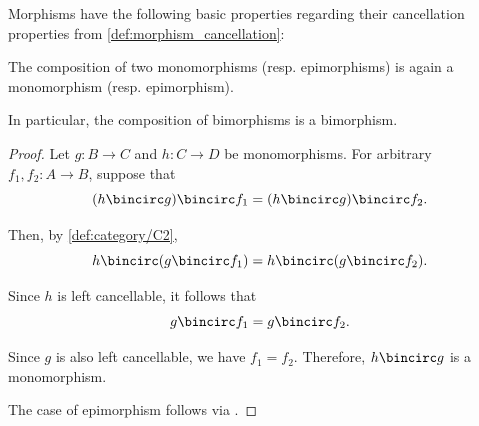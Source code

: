 \begin{proposition}\label{thm:def:morphism_cancellation}
  Morphisms have the following basic properties regarding their cancellation properties from \cref{def:morphism_cancellation}:
  \begin{thmenum}
     The composition of two monomorphisms (resp. epimorphisms) is again a monomorphism (resp. epimorphism).

    In particular, the composition of bimorphisms is a bimorphism.
  \end{thmenum}
\end{proposition}
\begin{proof}
   Let \( g: B \to C \) and \( h: C \to D \) be monomorphisms. For arbitrary \( f_1, f_2: A \to B \), suppose that
  \begin{equation*}
    (h \bincirc g) \bincirc f_1 = (h \bincirc g) \bincirc f_2.
  \end{equation*}

  Then, by \ref{def:category/C2},
  \begin{equation*}
    h \bincirc (g \bincirc f_1) = h \bincirc (g \bincirc f_2).
  \end{equation*}

  Since \( h \) is left cancellable, it follows that
  \begin{equation*}
    g \bincirc f_1 = g \bincirc f_2.
  \end{equation*}

  Since \( g \) is also left cancellable, we have \( f_1 = f_2 \). Therefore, \( h \bincirc g \) is a monomorphism.

  The case of epimorphism follows via .
\end{proof}

